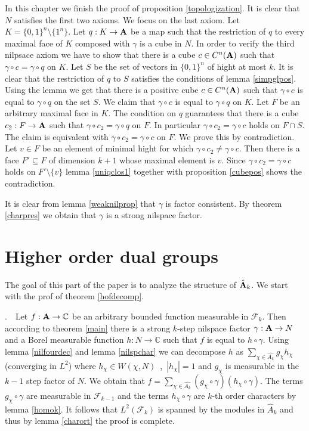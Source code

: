 \documentclass [11pt] {article}
\def\bA{{\bf A}}
\begin{document}
In this chapter we finish the proof of proposition \ref{topologization}.
It is clear that $N$ satisfies the first two axioms. We focus on the last axiom. Let $K=\{0,1\}^n\setminus\{1^n\}$. Let $q:K\rightarrow\bA$ be a map such that the restriction of $q$ to every maximal face of $K$ composed with $\gamma$ is a cube in $N$.
In order to verify the third nilpsace axiom we have to show that there is a cube $c\in C^n(\bA)$ such that $\gamma\circ c=\gamma\circ q$ on $K$.  
Let $S$ be the set of vectors in $\{0,1\}^n$ of hight at most $k$.  It is clear that the restriction of $q$ to $S$ satisfies the conditions of lemma \ref{simpglpos}. Using the lemma we get that there is a positive cube $c\in C^n(\bA)$ such that $\gamma\circ c$ is equal to $\gamma\circ q$ on the set $S$. 
We claim that $\gamma\circ c$ is equal to $\gamma\circ q$ on $K$.
Let $F$ be an arbitrary maximal face in $K$. The condition on $q$ guarantees that there is a cube $c_2:F\rightarrow\bA$ such that $\gamma\circ c_2=\gamma\circ q$ on $F$. In particular $\gamma\circ c_2=\gamma\circ c$ holds on $F\cap S$.
The claim is equivalent with $\gamma\circ c_2=\gamma\circ c$ on $F$. 
We prove this by contradiction. Let $v\in F$ be an element of minimal hight for which $\gamma\circ c_2\neq\gamma\circ c$. Then there is a face $F'\subseteq F$ of dimension $k+1$ whose maximal element is $v$. Since $\gamma\circ c_2=\gamma\circ c$ holds on $F'\setminus\{v\}$ lemma \ref{uniqclos1} together with proposition \ref{cubepos} shows the contradiction. 

It is clear from lemma \ref{weaknilprop} that $\gamma$ is factor consistent. By theorem \ref{charpres} we obtain that $\gamma$ is a strong nilspace factor.

\medskip

\section{Higher order dual groups}\label{chap:higherdual}

The goal of this part of the paper is to analyze the structure of $\hat{\bA}_k$. We start with the prof of theorem \ref{hofdecomp}.

\medskip

.~~Let $f:\bA\rightarrow\mathbb{C}$ be an arbitrary bounded function measurable in $\mathcal{F}_k$. Then according to theorem \ref{main} there is a strong $k$-step nilspace factor $\gamma:\bA\rightarrow N$ and a Borel measurable function $h:N\rightarrow\mathbb{C}$ such that $f$ is equal to $h\circ\gamma$. Using lemma \ref{nilfourdec} and lemma \ref{nilspchar} we can decompose $h$ as $\sum_{\chi\in\hat{A_k}}g_\chi h_\chi$ (converging in $L^2$) where $h_\chi\in W(\chi,N)$~,~$|h_\chi|=1$ and $g_\chi$ is measurable in the $k-1$ step factor of $N$. We obtain that $f=\sum_{\chi\in\hat{A_k}}(g_\chi\circ\gamma)( h_\chi\circ\gamma)$. The terms $g_\chi\circ\gamma$ are measurable in $\mathcal{F}_{k-1}$ and the terms $h_\chi\circ\gamma$ are $k$-th order characters by lemma \ref{homok}. It follows that $L^2(\mathcal{F}_k)$ is spanned by the modules in $\hat{A}_k$ and thus by lemma \ref{charort} the proof is complete.
\end{document}
